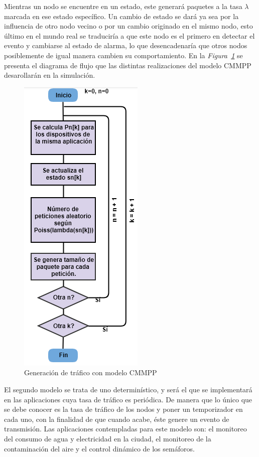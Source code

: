 Mientras un nodo se encuentre en un estado, este generará paquetes a la tasa $\lambda$ marcada en ese estado específico. Un cambio de estado se dará ya sea por la influencia de otro nodo vecino o por un cambio originado en el mismo nodo, esto último en el mundo real se traduciría a que este nodo es el primero en detectar el evento y cambiarse al estado de alarma, lo que desencadenaría que otros nodos posiblemente de igual manera cambien su comportamiento. En la \textit{Figura~\ref{fig:CMMPP_Algoritmo}} se presenta el diagrama de flujo que las distintas realizaciones del modelo CMMPP desarollarán en la simulación.\newline

\begin{figure}[th]
\centering
\includegraphics[scale=.7]{Figures/Generación de tráfico con modelo CMMPP}
\decoRule
\caption[Generación de tráfico con modelo CMMPP]{Generación de tráfico con modelo CMMPP}
\label{fig:CMMPP_Algoritmo}
\end{figure}

El segundo modelo se trata de uno determinístico, y será el que se implementará en las aplicaciones cuya tasa de tráfico es periódica. De manera que lo único que se debe conocer es la tasa de tráfico de los nodos y poner un temporizador en cada uno, con la finalidad de que cuando acabe, éste genere un evento de transmisión. Las aplicaciones contempladas para este modelo son: el monitoreo del consumo de agua y electricidad en la ciudad, el monitoreo de la contaminación del aire y el control dinámico de los semáforos.\newline


